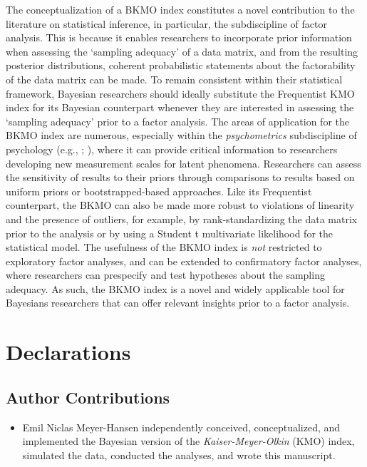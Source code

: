 \documentclass[
  10pt,
  a4paper,
  twoside]{article}
\providecommand{\tightlist}{%
  \setlength{\itemsep}{0pt}\setlength{\parskip}{0pt}}
\begin{document}
The conceptualization of a BKMO index constitutes a novel contribution to the literature on statistical inference, in particular, the subdiscipline of factor analysis. This is because it enables researchers to incorporate prior information when assessing the `sampling adequacy' of a data matrix, and from the resulting posterior distributions, coherent probabilistic statements about the factorability of the data matrix can be made. To remain consistent within their statistical framework, Bayesian researchers should ideally substitute the Frequentist KMO index for its Bayesian counterpart whenever they are interested in assessing the `sampling adequacy' prior to a factor analysis. The areas of application for the BKMO index are numerous, especially within the \emph{psychometrics} subdiscipline of psychology (e.g., ; ), where it can provide critical information to researchers developing new measurement scales for latent phenomena. Researchers can assess the sensitivity of results to their priors through comparisons to results based on uniform priors or bootstrapped-based approaches. Like its Frequentist counterpart, the BKMO can also be made more robust to violations of linearity and the presence of outliers, for example, by rank-standardizing the data matrix prior to the analysis or by using a Student t multivariate likelihood for the statistical model. The usefulness of the BKMO index is \emph{not} restricted to exploratory factor analyses, and can be extended to confirmatory factor analyses, where researchers can prespecify and test hypotheses about the sampling adequacy. As such, the BKMO index is a novel and widely applicable tool for Bayesians researchers that can offer relevant insights prior to a factor analysis.

\section{Declarations}\label{sec:sec_declarations}

\subsection{Author Contributions}\label{author-contributions}

\begin{itemize}
\tightlist
\item
  Emil Niclas Meyer-Hansen independently conceived, conceptualized, and implemented the Bayesian version of the \emph{Kaiser-Meyer-Olkin} (KMO) index, simulated the data, conducted the analyses, and wrote this manuscript.
\end{itemize}
\end{document}
